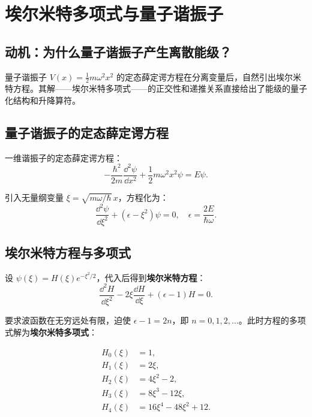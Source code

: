 \section{埃尔米特多项式与量子谐振子}
\label{sec:hermite}

\subsection*{动机：为什么量子谐振子产生离散能级？}

量子谐振子 $V(x) = \frac12 m\omega^2 x^2$ 的定态薛定谔方程在分离变量后，自然引出埃尔米特方程。其解——埃尔米特多项式——的正交性和递推关系直接给出了能级的量子化结构和升降算符。

\subsection{量子谐振子的定态薛定谔方程}

一维谐振子的定态薛定谔方程：
\begin{equation}
-\frac{\hbar^2}{2m}\frac{\dd^2\psi}{\dd x^2} + \frac12 m\omega^2 x^2\psi = E\psi.
\end{equation}

引入无量纲变量 $\xi = \sqrt{m\omega/\hbar}\,x$，方程化为：
\begin{equation}
\frac{\dd^2\psi}{\dd\xi^2} + (\epsilon - \xi^2)\psi = 0,\quad \epsilon = \frac{2E}{\hbar\omega}.
\label{eq:hermite_ode_raw}
\end{equation}

\subsection{埃尔米特方程与多项式}

设 $\psi(\xi) = H(\xi)e^{-\xi^2/2}$，代入后得到\textbf{埃尔米特方程}：
\begin{equation}
\frac{\dd^2 H}{\dd\xi^2} - 2\xi\frac{\dd H}{\dd\xi} + (\epsilon - 1)H = 0.
\label{eq:hermite_ode}
\end{equation}

要求波函数在无穷远处有限，迫使 $\epsilon - 1 = 2n$，即 $n=0,1,2,\dots$。此时方程的多项式解为\textbf{埃尔米特多项式}：

\begin{align}
H_0(\xi) &= 1,\\
H_1(\xi) &= 2\xi,\\
H_2(\xi) &= 4\xi^2 - 2,\\
H_3(\xi) &= 8\xi^3 - 12\xi,\\
H_4(\xi) &= 16\xi^4 - 48\xi^2 + 12.
\end{align}

